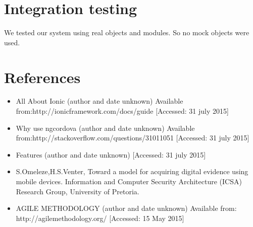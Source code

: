 \documentclass[a4paper,12pt]{article}
\begin{document}
\section{Integration testing}
We tested our system using real objects and modules. So no mock objects were used.

\section{References}
\begin{itemize}
\item All About Ionic (author and date unknown) 
Available from:http://ionicframework.com/docs/guide
[Accessed: 31 july 2015]
\item Why use ngcordova (author and date unknown) 
Available from:http://stackoverflow.com/questions/31011051
[Accessed: 31 july 2015]
\item Features  (author and date unknown) 
[Accessed: 31 july 2015]
\item S.Omeleze,H.S.Venter, Toward a model for acquiring digital evidence using mobile devices. Information and Computer Security Architecture (ICSA) Research Group, University of Pretoria.
\item AGILE METHODOLOGY (author and date unknown)
	Available from: http://agilemethodology.org/ [Accessed: 15 May 2015]
\end{itemize}
\end{document}
